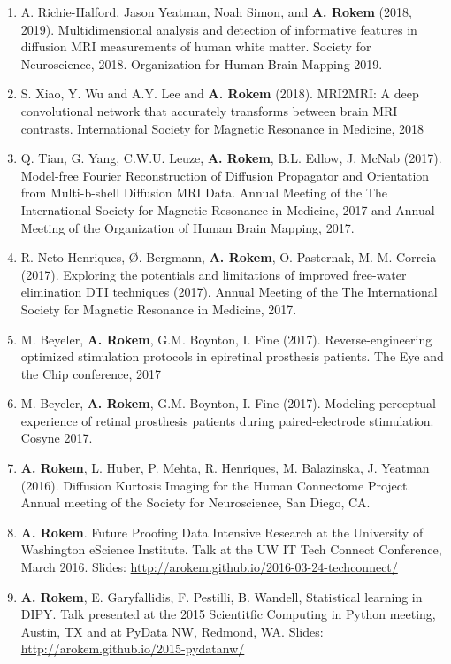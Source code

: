\documentclass[11pt,fullpage]{article}
\begin{document}
\begin{enumerate}
\item A. Richie-Halford, Jason Yeatman, Noah Simon, and {\bf A. Rokem} (2018, 2019).
Multidimensional analysis and detection of informative features in diffusion MRI measurements
of human white matter. Society for Neuroscience, 2018. Organization for Human Brain Mapping 2019.

\item S. Xiao, Y. Wu and A.Y. Lee and {\bf A. Rokem} (2018).
MRI2MRI: A deep convolutional network that accurately transforms between brain MRI contrasts.
International Society for Magnetic Resonance in Medicine, 2018

\item Q. Tian, G. Yang, C.W.U. Leuze, {\bf A. Rokem}, B.L. Edlow, J. McNab
(2017). Model-free Fourier Reconstruction of Diffusion Propagator and
Orientation from Multi-b-shell Diffusion MRI Data. Annual Meeting of the The
International Society for Magnetic Resonance in Medicine, 2017 and Annual Meeting of the Organization of Human Brain Mapping, 2017.

\item R. Neto-Henriques, Ø. Bergmann, {\bf A. Rokem}, O. Pasternak, M. M.
Correia (2017).  Exploring the potentials and limitations of improved free-water
elimination DTI techniques (2017). Annual Meeting of the The International
Society for Magnetic Resonance in Medicine, 2017.

\item M. Beyeler, {\bf A. Rokem}, G.M. Boynton, I. Fine (2017).
Reverse-engineering optimized stimulation protocols in epiretinal prosthesis
patients. The Eye and the Chip conference, 2017

\item M. Beyeler, {\bf A. Rokem}, G.M. Boynton, I. Fine (2017). Modeling
perceptual experience of retinal prosthesis patients during paired-electrode
stimulation. Cosyne 2017.

\item {\bf A. Rokem}, L. Huber, P. Mehta, R. Henriques, M. Balazinska, J. Yeatman (2016). Diffusion Kurtosis Imaging for the Human Connectome Project. Annual meeting of the Society for Neuroscience, San Diego, CA.

\item {\bf A. Rokem}. Future Proofing Data Intensive Research at the University of Washington eScience Institute. Talk at the UW IT Tech Connect Conference, March 2016. Slides: \url{http://arokem.github.io/2016-03-24-techconnect/}

\item {\bf A. Rokem}, E. Garyfallidis, F. Pestilli, B. Wandell, Statistical learning in DIPY. Talk presented at the 2015 Scientitfic Computing in Python meeting, Austin, TX and at PyData NW, Redmond, WA. Slides: \url{http://arokem.github.io/2015-pydatanw/}


\end{enumerate}
\end{document}
